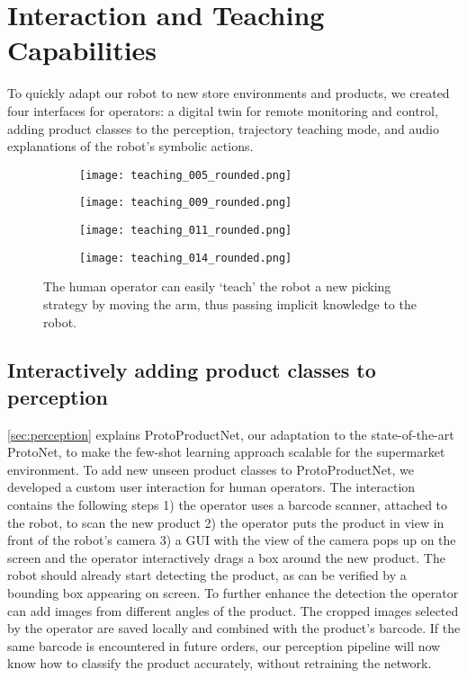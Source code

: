 \section{Interaction and Teaching Capabilities}
\label{sec:teaching}

To quickly adapt our robot to new store environments and
products, we created four interfaces for operators: a
digital twin for remote monitoring and control, adding
product classes to the perception, trajectory teaching mode,
and audio explanations of the robot's symbolic actions.


\begin{figure}[t]
  \centering
  \begin{subfigure}[b]{0.45\linewidth}
    \centering
    \texttt{[image: teaching\_005\_rounded.png]}
    \caption{}
    \label{subfig:teaching_1}
  \end{subfigure}
  \begin{subfigure}[b]{0.45\linewidth}
    \centering
    \texttt{[image: teaching\_009\_rounded.png]}
    \caption{}
    \label{subfig:teaching_2}
  \end{subfigure}
  \begin{subfigure}[b]{0.45\linewidth}
    \centering
    \texttt{[image: teaching\_011\_rounded.png]}
    \caption{}
    \label{subfig:teaching_3}
  \end{subfigure}
  \begin{subfigure}[b]{0.45\linewidth}
    \centering
    \texttt{[image: teaching\_014\_rounded.png]}
    \caption{}
    \label{subfig:teaching_4}
  \end{subfigure}
  \caption{The human operator can easily `teach' the robot a new picking
  strategy by moving the arm, thus passing implicit knowledge to the
  robot.}
  \label{fig:recording}
\end{figure}
\subsection{Interactively adding product classes to perception}
\cref{sec:perception} explains ProtoProductNet, our
adaptation to the state-of-the-art ProtoNet, to make the
few-shot learning approach scalable for the supermarket
environment. To add new unseen product classes to
ProtoProductNet, we developed a custom user interaction for
human operators. The interaction contains the following
steps 1) the operator uses a barcode scanner, attached to
the robot, to scan the new product 2) the operator puts the
product in view in front of the robot's camera 3) a GUI with the view of the camera pops up on the screen and the operator interactively drags a box around the new product. The robot should already start detecting the product, as can be verified by a bounding box appearing on screen. To further enhance the detection the operator can add images from different angles of the product. The cropped images selected by the operator are saved locally and combined with the product's barcode. If the same barcode is encountered in future orders, our perception pipeline will now know how to classify the product accurately, without retraining the network.


